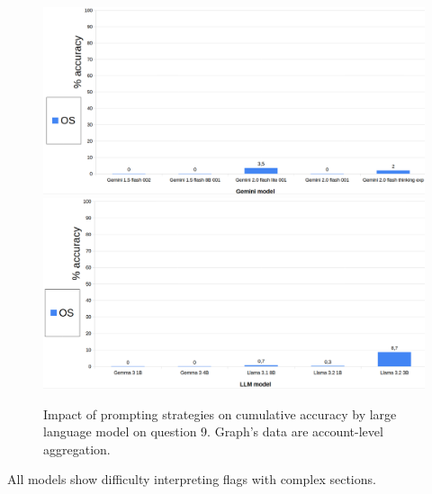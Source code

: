 \documentclass[12pt]{article}
\begin{document}
\begin{figure}[H]
    \centering
            \includegraphics[width=1\textwidth]{q203Gemini.png}
            \includegraphics[width=1\textwidth]{q203Other.png}
    \caption[Accuracy on Question 9 by LLM]{Impact of prompting strategies on cumulative accuracy by large language model on question 9. Graph's data are account-level aggregation.}
    \end{figure} 
All models show difficulty interpreting flags with complex sections.\\

\vspace{2cm}

\end{document}
